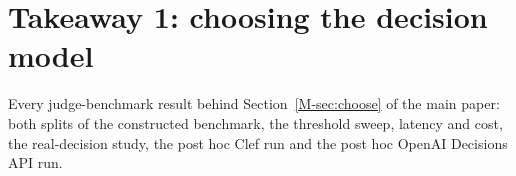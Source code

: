 \section{Takeaway 1: choosing the decision model}\label{sec:b}

Every judge-benchmark result behind Section~\ref{M-sec:choose} of the main paper: both splits of the constructed
benchmark, the threshold sweep, latency and cost, the real-decision study, the post hoc Clef run and the post hoc
OpenAI Decisions API run.










